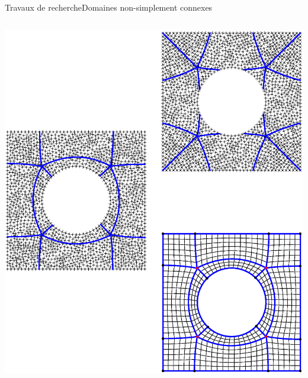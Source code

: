 \documentclass[compress,10pt,aspectratio=169]{beamer}
\begin{document}
\begin{frame}{Travaux de recherche}{Domaines non-simplement connexes}
\begin{columns}
\begin{column}{0.32\textwidth}
\includegraphics[scale=0.27]{images/image.eps}
\end{column}
\end{columns}
\end{frame}
\end{document}
